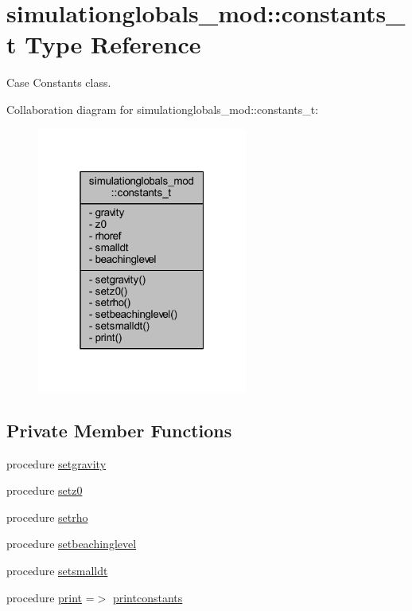 \hypertarget{structsimulationglobals__mod_1_1constants__t}{}\section{simulationglobals\+\_\+mod\+:\+:constants\+\_\+t Type Reference}
\label{structsimulationglobals__mod_1_1constants__t}


Case Constants class.  




Collaboration diagram for simulationglobals\+\_\+mod\+:\+:constants\+\_\+t\+:\nopagebreak
\begin{figure}[H]
\begin{center}
\leavevmode
\includegraphics[width=196pt]{structsimulationglobals__mod_1_1constants__t__coll__graph}
\end{center}
\end{figure}
\subsection*{Private Member Functions}
\begin{DoxyCompactItemize}
\item 
procedure \mbox{\hyperlink{structsimulationglobals__mod_1_1constants__t_aac39b1720d2d3f9a7497c69f83694c9a}{setgravity}}
\item 
procedure \mbox{\hyperlink{structsimulationglobals__mod_1_1constants__t_a6517422a0987640f0574bcce3c6566f1}{setz0}}
\item 
procedure \mbox{\hyperlink{structsimulationglobals__mod_1_1constants__t_a8c3a9d4776bce5b6e7ae475bd7711f0b}{setrho}}
\item 
procedure \mbox{\hyperlink{structsimulationglobals__mod_1_1constants__t_a29fa4fda8d4382821d48942ea8232c15}{setbeachinglevel}}
\item 
procedure \mbox{\hyperlink{structsimulationglobals__mod_1_1constants__t_abae3cbfbc8ed893c747a8088da5372e6}{setsmalldt}}
\item 
procedure \mbox{\hyperlink{structsimulationglobals__mod_1_1constants__t_a287a252cb5c736b4da24d79cf9c59897}{print}} =$>$ \mbox{\hyperlink{namespacesimulationglobals__mod_a139cb36f8366e6aec875c7977235fd68}{printconstants}}
\end{DoxyCompactItemize}
